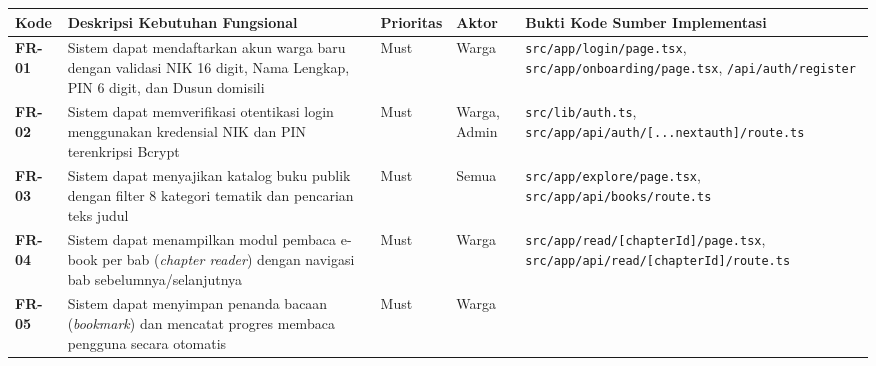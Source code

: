 \documentclass[
  indonesian,
  12pt,
]{report}
\newcounter{none} %
\begin{document}
{\def\LTcaptype{none} %
\begin{longtable}[]{@{}
  >{\raggedright\arraybackslash}p{}
  >{\raggedright\arraybackslash}p{}
  >{\centering\arraybackslash}p{}
  >{\raggedright\arraybackslash}p{}
  >{\raggedright\arraybackslash}p{}@{}}
\toprule\noalign{}
\begin{minipage}[b]{\linewidth}\raggedright
Kode
\end{minipage} & \begin{minipage}[b]{\linewidth}\raggedright
Deskripsi Kebutuhan Fungsional
\end{minipage} & \begin{minipage}[b]{\linewidth}\centering
Prioritas
\end{minipage} & \begin{minipage}[b]{\linewidth}\raggedright
Aktor
\end{minipage} & \begin{minipage}[b]{\linewidth}\raggedright
Bukti Kode Sumber Implementasi
\end{minipage} \\
\midrule\noalign{}
\endhead
\bottomrule\noalign{}
\endlastfoot
\textbf{FR-01} & Sistem dapat mendaftarkan akun warga baru dengan
validasi NIK 16 digit, Nama Lengkap, PIN 6 digit, dan Dusun domisili &
Must & Warga & \texttt{src/app/login/page.tsx},
\texttt{src/app/onboarding/page.tsx}, \texttt{/api/auth/register} \\
\textbf{FR-02} & Sistem dapat memverifikasi otentikasi login menggunakan
kredensial NIK dan PIN terenkripsi Bcrypt & Must & Warga, Admin &
\texttt{src/lib/auth.ts},
\texttt{src/app/api/auth/{[}...nextauth{]}/route.ts} \\
\textbf{FR-03} & Sistem dapat menyajikan katalog buku publik dengan
filter 8 kategori tematik dan pencarian teks judul & Must & Semua &
\texttt{src/app/explore/page.tsx},
\texttt{src/app/api/books/route.ts} \\
\textbf{FR-04} & Sistem dapat menampilkan modul pembaca e-book per bab
(\emph{chapter reader}) dengan navigasi bab sebelumnya/selanjutnya &
Must & Warga & \texttt{src/app/read/{[}chapterId{]}/page.tsx},
\texttt{src/app/api/read/{[}chapterId{]}/route.ts} \\
\textbf{FR-05} & Sistem dapat menyimpan penanda bacaan (\emph{bookmark})
dan mencatat progres membaca pengguna secara otomatis & Must & Warga &

\end{longtable}}
\end{document}
